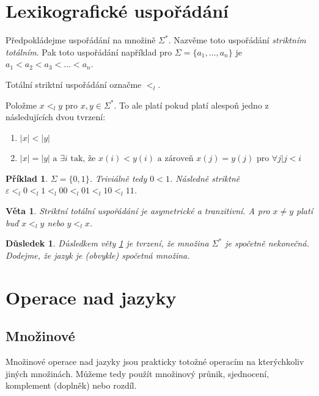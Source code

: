 \documentclass[10pt, a4paper, titlepage]{article}
\theoremstyle{note}
\newtheorem{veta}{\textbf{Věta}}
\newtheorem{priklad}{\textbf{Příklad}}
\newtheorem{dusledek}{\textbf{Důsledek}}
\begin{document}
\section{Lexikografické uspořádání}
Předpokládejme uspořádání na množině $\Sigma^{*}$.
Nazvěme toto uspořádání \emph{striktním totálním}. Pak toto uspořádání například pro $\Sigma = \lbrace a_{1}, \ldots, a_{n} \rbrace$
je $a_{1} < a_{2} < a_{3} < \ldots < a_{n}$.

Totální striktní uspořádání označme $<_{l}$.

Položme $x <_{l} y$ pro $x,y \in \Sigma^{*}$. To ale platí pokud platí alespoň jedno z následujících dvou tvrzení:
\begin{enumerate}
\item
$|x| < |y|$

\item
$|x| = |y| \text{ a } \exists i \text{ tak, že } x(i) < y(i) \text{ a zároveň } x(j) = y(j) \text{ pro } \forall j |j < i$
\end{enumerate}

\begin{priklad}
$\Sigma = \lbrace 0, 1 \rbrace$. Triviálně tedy $0 < 1$.
Následně striktně $\varepsilon <_{l} 0 <_{l} 1 <_{l} 00 <_{l} 01 <_{l} 10 <_{l} 11$.
\end{priklad}

\begin{veta} \label{veta-1}
Striktní totální uspořádání je asymetrické a tranzitivní. A pro $x \neq y$ platí buď $x <_{l} y$ nebo $y <_{l} x$.
\end{veta}

\begin{dusledek}
Důsledkem věty \ref{veta-1} je tvrzení, že množina $\Sigma^{*}$ je spočetně nekonečná. Dodejme, že jazyk je (obvykle) spočetná množina.
\end{dusledek}

\section{Operace nad jazyky}

\subsection{Množinové}
Množinové operace nad jazyky jsou prakticky totožné operacím na kterýchkoliv jiných množinách. Můžeme tedy použít množinový průnik, sjednocení, komplement (doplněk) nebo rozdíl.
\end{document}
